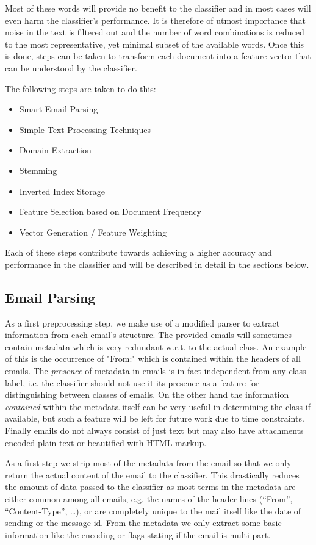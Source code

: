 Most of these words will provide no benefit to the classifier and in most cases will even harm the classifier's performance. It is therefore of utmost importance that noise in the text is filtered out and the number of word combinations is reduced to the most representative, yet minimal subset of the available words. Once this is done, steps can be taken to transform each document into a feature vector that can be understood by the classifier. 

The following steps are taken to do this:
\begin{itemize}
	\item Smart Email Parsing
	\item Simple Text Processing Techniques
	\item Domain Extraction
	\item Stemming
	\item Inverted Index Storage
	\item Feature Selection based on Document Frequency
	\item Vector Generation / Feature Weighting
\end{itemize}

Each of these steps contribute towards achieving a higher accuracy and performance in the classifier and will be described in detail in the sections below.

\subsection{Email Parsing}
As a first preprocessing step, we make use of a modified parser to extract information from each email's structure.
The provided emails will sometimes contain metadata which is very redundant w.r.t. to the actual class. 
An example of this is the occurrence of "From:" which is contained within the headers of all emails. 
The \emph{presence} of metadata in emails is in fact independent from any class label, i.e. the classifier should not use it its presence as a feature for distinguishing between classes of emails.
On the other hand the information \emph{contained} within the metadata itself can be very useful in determining the class if available, but such a feature will be left for future work due to time constraints.
Finally emails do not always consist of just text but may also have attachments encoded plain text or beautified with HTML markup. 


As a first step we strip most of the metadata from the email so that we only return the actual content of the email to the classifier.
This drastically reduces the amount of data passed to the classifier as most terms in the metadata are either common among all emails, e.g. the names of the header lines (``From'', ``Content-Type'', \dots), or are completely unique to the mail itself like the date of sending or the message-id.
From the metadata we only extract some basic information like the encoding or flags stating if the email is multi-part.

